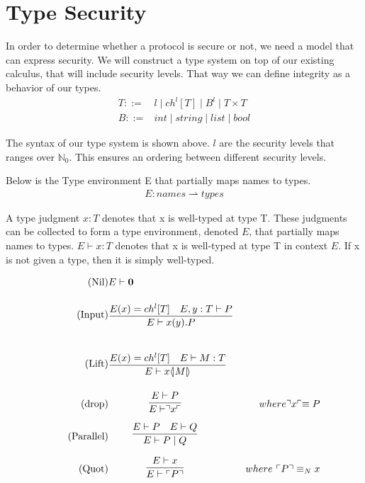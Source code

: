 \section{Type Security}
In order to determine whether a protocol is secure or not, we need a model that can express security.
We will construct a type system on top of our existing calculus, that will include security levels.
That way we can define integrity as a behavior of our types.
\begin{align*}
	T::=&l\mid ch^l[T]\mid B^l\mid T\times T\\
	B::=&int\mid string\mid list\mid bool
\end{align*}

\noindent The syntax of our type system is shown above.
$l$ are the security levels that ranges over $\mathbb{N}_0$.
This ensures an ordering between different security levels.

Below is the Type environment E that partially maps names to types.
\begin{align*}
E: names \rightharpoonup types
\end{align*}

\noindent A type judgment $x:T$ denotes that x is well-typed at type T.
These judgments can be collected to form a type environment, denoted $E$, that partially maps names to types.
$E\vdash x:T$ denotes that x is well-typed at type T in context $E$.
If x is not given a type, then it is simply well-typed.


\begin{align}
\tag{Nil} &E \vdash \nil\\
\tag{Input} &\infrule{E(x) = ch^l[T]\quad E,y:T\vdash P}{E \vdash \inp{x}{y}P}\\
\tag{Lift} &\infrule{E(x) = ch^l[T] \quad E \vdash M:T}{E\vdash \lift{x}{M}}\\
\tag{drop} &\infrule{E \vdash P}{E\vdash \drop{x}}& where \drop{x} \equiv P\\
\tag{Parallel} &\infrule{E\vdash P \quad E \vdash Q}{E \vdash P \para Q}\\
\tag{Quot} &\infrule{E \vdash x}{E\vdash \quot{P}}& where\ \quot{P} \equiv_N x
\end{align}

